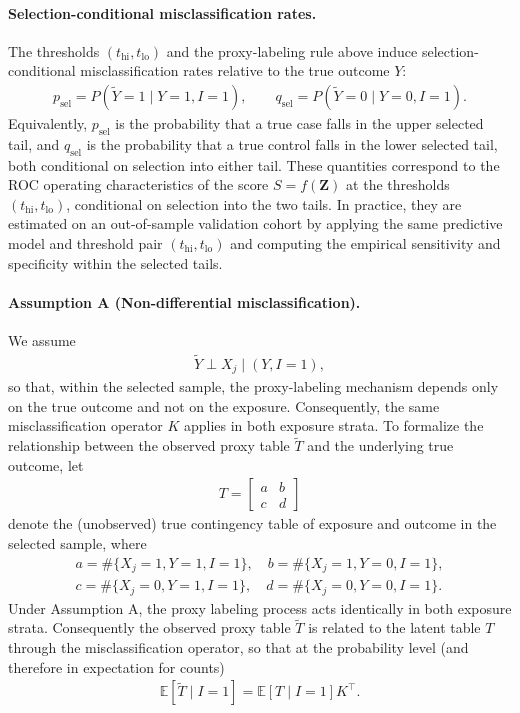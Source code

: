 \documentclass[pdflatex,sn-mathphys-num]{sn-jnl}%
\def\EQSP{3pt}
\newcommand{\cgather}[2][\EQSP]{\begingroup\setlength\abovedisplayskip{#1}\setlength\belowdisplayskip{#1}\begin{gather} #2 \end{gather}\endgroup\noindent}
\theoremstyle{thmstyleone}%
\theoremstyle{thmstyletwo}%
\theoremstyle{thmstylethree}%
\begin{document}
\paragraph{Selection-conditional misclassification rates.}
The thresholds $(t_{\mathrm{hi}},t_{\mathrm{lo}})$ and the proxy-labeling rule above induce selection-conditional misclassification rates relative to the true outcome $Y$:
\cgather{
p_{\mathrm{sel}}=P(\tilde Y=1\mid Y=1,I=1),\qquad
q_{\mathrm{sel}}=P(\tilde Y=0\mid Y=0,I=1).
}
Equivalently, $p_{\mathrm{sel}}$ is the probability that a true case falls in the upper selected tail, and $q_{\mathrm{sel}}$ is the probability that a true control falls in the lower selected tail, both conditional on selection into either tail. %
These quantities correspond to the ROC operating characteristics of the score $S=f(\mathbf Z)$ at the thresholds $(t_{\mathrm{hi}},t_{\mathrm{lo}})$, conditional on selection into the two tails. In practice, they are estimated on an out-of-sample validation cohort by applying the same predictive model and threshold pair $(t_{\mathrm{hi}},t_{\mathrm{lo}})$ and computing the empirical sensitivity and specificity within the selected tails.


\paragraph{Assumption A (Non-differential misclassification).}
We assume
\cgather{
\tilde Y \perp X_j \mid (Y,I=1),
}
so that, within the selected sample, the proxy-labeling mechanism depends only on the true outcome and not on the exposure. Consequently, the same misclassification operator $K$ applies in both exposure strata. To formalize the relationship between the observed proxy table $\tilde T$ and the underlying true outcome, let
\cgather{
T=
\begin{bmatrix}
a & b\\
c & d
\end{bmatrix}
}
denote the (unobserved) true contingency table of exposure and outcome in the selected sample, where
\cgather{
a=\#\{X_j=1,Y=1,I=1\},\quad
b=\#\{X_j=1,Y=0,I=1\},\\
c=\#\{X_j=0,Y=1,I=1\},\quad
d=\#\{X_j=0,Y=0,I=1\}.
}
Under Assumption A, the proxy labeling process acts identically in both exposure strata. Consequently the observed proxy table $\tilde T$ is related to the latent table $T$ through the misclassification operator, so that at the probability level (and therefore in expectation for counts)
\cgather{
\mathbb{E}[\tilde T\mid I=1]
=
\mathbb{E}[T\mid I=1]K^\top.
}
\end{document}
